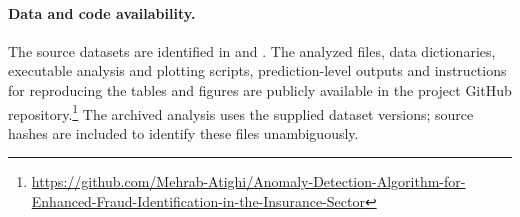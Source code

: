 


\paragraph{Data and code availability.}
The source datasets are identified in \citet{dataset} and
\citet{insuranceclaims}. The analyzed files, data dictionaries, executable
analysis and plotting scripts, prediction-level outputs and instructions
for reproducing the tables and figures are publicly available in the
project GitHub repository.\footnote{\url{https://github.com/Mehrab-Atighi/Anomaly-Detection-Algorithm-for-Enhanced-Fraud-Identification-in-the-Insurance-Sector}}
The archived analysis uses the supplied dataset versions; source hashes
are included to identify these files unambiguously.
